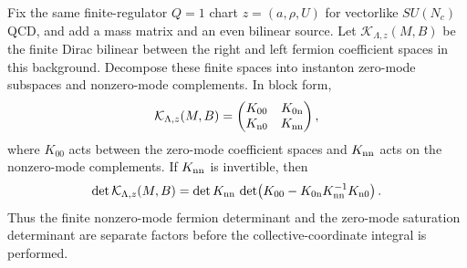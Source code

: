 \begin{proposition}
\label{prop:instanton-fermion-determinant-zero-mode-factorization}
Fix the same finite-regulator \(Q=1\) chart \(z=(a,\rho,U)\) for vectorlike
\(SU(N_c)\) QCD, and add a mass matrix and an even bilinear source.  Let
\(\mathcal K_{\Lambda,z}(M,B)\) be the finite Dirac bilinear between the
right and left fermion coefficient spaces in this background.  Decompose
these finite spaces into instanton zero-mode subspaces and nonzero-mode
complements.  In block form,
\begin{equation}
  \mathcal K_{\Lambda,z}(M,B)
  =
  \begin{pmatrix}
    K_{00} & K_{0{\rm n}}\\
    K_{{\rm n}0} & K_{{\rm nn}}
  \end{pmatrix},
  \label{eq:instanton-fermion-block-operator}
\end{equation}
where \(K_{00}\) acts between the zero-mode coefficient spaces and
\(K_{{\rm nn}}\) acts on the nonzero-mode complements.  If \(K_{{\rm nn}}\)
is invertible, then
\begin{equation}
  \det \mathcal K_{\Lambda,z}(M,B)
  =
  \det K_{{\rm nn}}\,
  \det\!\left(
    K_{00}-K_{0{\rm n}}K_{{\rm nn}}^{-1}K_{{\rm n}0}
  \right).
  \label{eq:instanton-fermion-schur-factorization}
\end{equation}
Thus the finite nonzero-mode fermion determinant and the zero-mode
saturation determinant are separate factors before the collective-coordinate
integral is performed.


\end{proposition}
